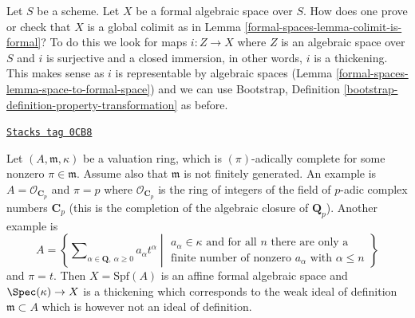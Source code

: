 Let $S$ be a scheme. Let $X$ be a formal algebraic space over $S$.
How does one prove or check that $X$ is a global colimit as in
Lemma \ref{formal-spaces-lemma-colimit-is-formal}? To do this we look for maps
$i : Z \to X$ where $Z$ is an algebraic space over $S$ and $i$ is
surjective and a closed immersion, in other words, $i$ is a thickening.
This makes sense as $i$ is representable by algebraic spaces
(Lemma \ref{formal-spaces-lemma-space-to-formal-space}) and we can use
Bootstrap, Definition \ref{bootstrap-definition-property-transformation}
as before.

\begin{example}
\label{formal-spaces-example-david-hansen}
\href{https://stacks.math.columbia.edu/tag/0CB8}{\texttt{Stacks tag 0CB8}}

Let $(A, \mathfrak m, \kappa)$ be a valuation ring, which is
$(\pi)$-adically complete for some nonzero $\pi \in \mathfrak m$.
Assume also that $\mathfrak m$ is not finitely generated.
An example is $A = \mathcal{O}_{\mathbf{C}_p}$ and $\pi = p$
where $\mathcal{O}_{\mathbf{C}_p}$ is the ring of integers
of the field of $p$-adic complex numbers $\mathbf{C}_p$
(this is the completion of the algebraic closure of
$\mathbf{Q}_p$). Another example is
$$
A =
\left\{
\sum\nolimits_{\alpha \in \mathbf{Q},\ \alpha \geq 0} a_\alpha t^\alpha
\middle|
\begin{matrix}
a_\alpha \in \kappa \text{ and for all }n\text{ there are only a} \\
\text{finite number of nonzero }a_\alpha
\text{ with }\alpha \leq n
\end{matrix}
\right\}
$$
and $\pi = t$. Then $X = \text{Spf}(A)$ is an affine formal algebraic
space and $\Spec(\kappa) \to X$ is a thickening which corresponds
to the weak ideal of definition $\mathfrak m \subset A$
which is however not an ideal of definition.
\end{example}


